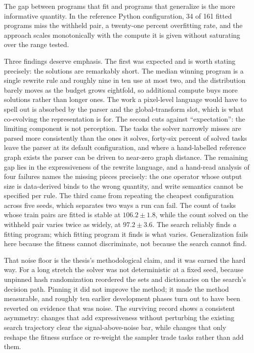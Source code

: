 The gap between programs that fit and programs that generalize is the more informative
quantity. In the reference Python configuration, 34 of 161 fitted programs miss the withheld
pair, a twenty-one percent overfitting rate, and the approach scales monotonically with the
compute it is given without saturating over the range tested.

Three findings deserve emphasis. The first was expected and is worth stating precisely: the
solutions are remarkably short. The
median winning program is a single rewrite rule and roughly nine in ten use at most two, and
the distribution barely moves as the budget grows eightfold, so additional compute buys more
solutions rather than longer ones. The work a pixel-level language would have to spell out is
absorbed by the parser and the global-transform slot, which is what co-evolving the
representation is for. The second cuts against ``expectation'': the limiting component is not
perception. The tasks the solver narrowly misses are parsed more consistently than the ones
it solves, forty-six percent of solved tasks leave the parser at its default configuration,
and where a hand-labelled reference graph exists the parser can be driven to near-zero graph
distance. The remaining gap lies in the expressiveness of the rewrite language, and a
hand-read analysis of four failures names the missing pieces precisely: the one operator
whose output size is data-derived binds to the wrong quantity, and write semantics cannot be
specified per rule. The third came from repeating the cheapest configuration across five
seeds, which separates
two ways a run can fail. The count of tasks whose train pairs are fitted is stable at
$106.2 \pm 1.8$, while the count solved on the withheld pair varies twice as widely, at
$97.2 \pm 3.6$. The search reliably finds \emph{a} fitting program; which fitting program it
finds is what varies. Generalization fails here because the fitness cannot discriminate, not
because the search cannot find.

That noise floor is the thesis's methodological claim, and it was earned the hard way. For a
long stretch the solver was not deterministic at a fixed seed, because unpinned hash
randomization reordered the sets and dictionaries on the search's decision path. Pinning it
did not improve the method; it made the method measurable, and roughly ten earlier
development phases turn out to have been reverted on evidence that was noise. The surviving
record shows a consistent asymmetry: changes that add expressiveness without perturbing the
existing search trajectory clear the signal-above-noise bar, while changes that only reshape
the fitness surface or re-weight the sampler trade tasks rather than add them.

